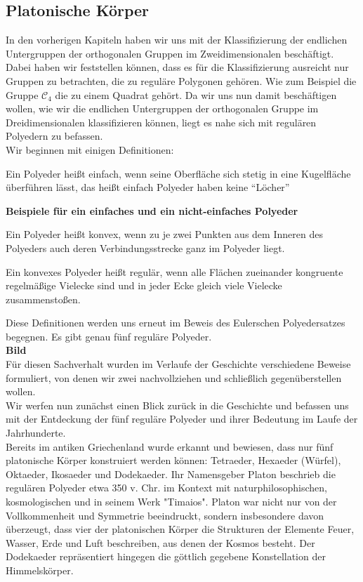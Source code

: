 \subsection{Platonische Körper}
In den vorherigen Kapiteln haben wir uns mit der Klassifizierung der endlichen Untergruppen der orthogonalen Gruppen im Zweidimensionalen beschäftigt. Dabei haben wir feststellen können, dass es für die Klassifizierung ausreicht nur Gruppen zu betrachten, die zu reguläre Polygonen gehören. Wie zum Beispiel die Gruppe $\mathcal{C}_4$ die zu einem Quadrat gehört. Da wir uns nun damit beschäftigen wollen, wie wir die endlichen Untergruppen der orthogonalen Gruppe im Dreidimensionalen klassifizieren können, liegt es nahe sich mit regulären Polyedern zu befassen.\\
Wir beginnen mit einigen Definitionen: 
\begin{defi}
	Ein Polyeder heißt einfach, wenn seine Oberfläche sich stetig in eine Kugelfläche überführen lässt, das heißt einfach Polyeder haben keine \enquote{Löcher} \citep[211]{Mainzer1988}
\end{defi}
\textbf{Beispiele für ein einfaches und ein nicht-einfaches Polyeder}
\begin{defi}
	Ein Polyeder heißt konvex, wenn zu je zwei Punkten aus dem Inneren des Polyeders auch deren Verbindungsstrecke ganz im Polyeder liegt. \citep[51]{Mueller2012}
\end{defi}
\begin{defi}
	Ein konvexes Polyeder heißt regulär, wenn alle Flächen zueinander kongruente regelmäßige Vielecke sind und in jeder Ecke gleich viele Vielecke zusammenstoßen. \citep[51]{Mueller2012}
\end{defi}
Diese Definitionen werden uns erneut im Beweis des Eulerschen Polyedersatzes begegnen. Es gibt genau fünf reguläre Polyeder.\\
\textbf{Bild}\\
Für diesen Sachverhalt wurden im Verlaufe der Geschichte verschiedene Beweise formuliert, von denen wir zwei nachvollziehen und schließlich gegenüberstellen wollen. \\
Wir werfen nun zunächst einen Blick zurück in die Geschichte und befassen uns mit der Entdeckung der fünf reguläre Polyeder und ihrer Bedeutung im Laufe der Jahrhunderte. \\
Bereits im antiken Griechenland wurde erkannt und bewiesen, dass nur fünf platonische Körper konstruiert werden können: Tetraeder, Hexaeder (Würfel), Oktaeder, Ikosaeder und Dodekaeder. Ihr Namensgeber Platon beschrieb die regulären Polyeder etwa 350 v. Chr. im Kontext mit naturphilosophischen, kosmologischen und in seinem Werk "Timaios". Platon war nicht nur von der Vollkommenheit und Symmetrie beeindruckt, sondern insbesondere davon überzeugt, dass vier der platonischen Körper die Strukturen der Elemente Feuer, Wasser, Erde und Luft beschreiben, aus denen der Kosmos besteht. Der Dodekaeder repräsentiert hingegen die göttlich gegebene Konstellation der Himmelskörper.\\
